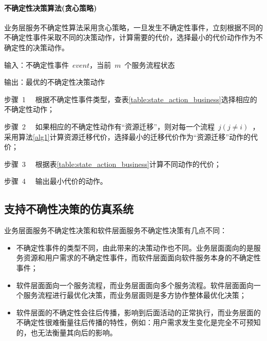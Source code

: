 %
%
%
%


\paragraph{不确定性决策算法(贪心策略)}

业务层服务不确定性算法采用贪心策略，一旦发生不确定性事件，立刻根据不同的不确定性事件采取不同的决策动作，计算需要的代价，选择最小的代价动作作为不确定性的决策动作。

输入：不确定性事件~$event$，当前~$m$~个服务流程状态

输出：最优的不确定性决策动作

步骤~1~~ 根据不确定性事件类型，查表\ref{table:state_action_business}选择相应的不确定性动作；

步骤~2~~ 如果相应的不确定性动作有“资源迁移”，则对每一个流程~$j (j \neq i)$~，采用算法\ref{alg1}计算资源迁移代价，选择最小的迁移代价作为“资源迁移”动作的代价；

步骤~3~~ 根据表\ref{table:state_action_business}计算不同动作的代价；

步骤~4~~ 输出最小代价的动作。


\subsection{支持不确性决策的仿真系统}

业务层面服务不确定性决策和软件层面服务不确定性决策有几点不同：

\begin{itemize}
    \item 不确定性事件的类型不同，由此带来的决策动作也不同。业务层面面向的是服务资源和用户需求的不确定性事件，而软件层面面向软件服务本身的不确定性事件；
    \item 软件层面面向一个服务流程，而业务层面面向多个服务流程。软件层面面向一个服务流程进行最优化决策，而业务层面则是多方协作整体最优化决策；
    \item 软件层面的不确定性会往后传播，影响到后面活动的正常执行，而业务层面的不确定性很难衡量往后传播的特性，例如：用户需求发生变化是完全不可预知的，也无法衡量其向后的影响。
\end{itemize}

